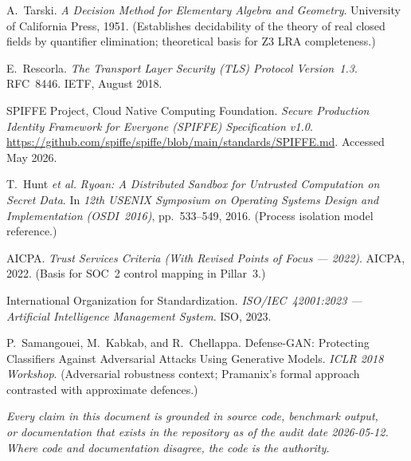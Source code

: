 \documentclass[12pt,a4paper,oneside]{report}
\begin{document}
\begin{enumerate}[label={[\arabic*]}]
  \item A.~Tarski. \textit{A Decision Method for Elementary Algebra and
        Geometry}. University of California Press, 1951.  (Establishes
        decidability of the theory of real closed fields by quantifier
        elimination; theoretical basis for Z3 LRA completeness.)

  \item E.~Rescorla. \textit{The Transport Layer Security (TLS) Protocol
        Version~1.3}. RFC~8446. IETF, August 2018.

  \item SPIFFE Project, Cloud Native Computing Foundation.
        \textit{Secure Production Identity Framework for Everyone (SPIFFE)
        Specification v1.0}.
        \url{https://github.com/spiffe/spiffe/blob/main/standards/SPIFFE.md}.
        Accessed May 2026.

  \item T.~Hunt \textit{et al.} \textit{Ryoan: A Distributed Sandbox for
        Untrusted Computation on Secret Data}. In \textit{12th USENIX
        Symposium on Operating Systems Design and Implementation (OSDI~2016)},
        pp.~533--549, 2016.  (Process isolation model reference.)

  \item AICPA. \textit{Trust Services Criteria (With Revised Points of Focus
        --- 2022)}. AICPA, 2022.  (Basis for SOC~2 control mapping in
        Pillar~3.)

  \item International Organization for Standardization.
        \textit{ISO/IEC~42001:2023 — Artificial Intelligence Management
        System}. ISO, 2023.

  \item P.~Samangouei, M.~Kabkab, and R.~Chellappa.
        Defense-GAN: Protecting Classifiers Against Adversarial Attacks Using
        Generative Models. \textit{ICLR 2018 Workshop}.  (Adversarial
        robustness context; Pramanix's formal approach contrasted with
        approximate defences.)
\end{enumerate}

\vfill
\begin{center}
  \small\itshape
  Every claim in this document is grounded in source code, benchmark output,\\
  or documentation that exists in the repository as of the audit date 2026-05-12.\\
  Where code and documentation disagree, the code is the authority.
\end{center}
\end{document}
